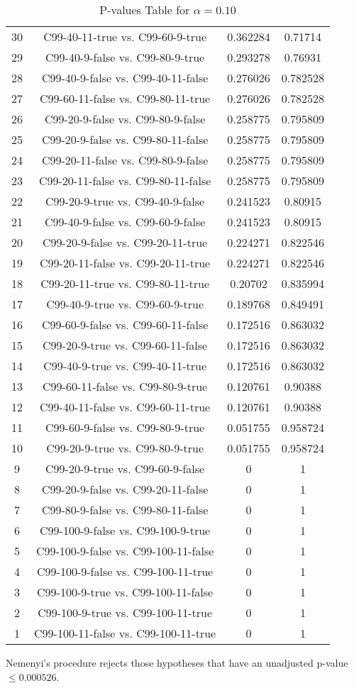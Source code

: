\documentclass[a4paper,10pt]{article}
\begin{document}
\begin{landscape}
\begin{table}[!htp]
\begin{tabular}{cccc}
30&C99-40-11-true vs. C99-60-9-true&0.362284&0.71714\\
29&C99-40-9-false vs. C99-80-9-true&0.293278&0.76931\\
28&C99-40-9-false vs. C99-40-11-false&0.276026&0.782528\\
27&C99-60-11-false vs. C99-80-11-true&0.276026&0.782528\\
26&C99-20-9-false vs. C99-80-9-false&0.258775&0.795809\\
25&C99-20-9-false vs. C99-80-11-false&0.258775&0.795809\\
24&C99-20-11-false vs. C99-80-9-false&0.258775&0.795809\\
23&C99-20-11-false vs. C99-80-11-false&0.258775&0.795809\\
22&C99-20-9-true vs. C99-40-9-false&0.241523&0.80915\\
21&C99-40-9-false vs. C99-60-9-false&0.241523&0.80915\\
20&C99-20-9-false vs. C99-20-11-true&0.224271&0.822546\\
19&C99-20-11-false vs. C99-20-11-true&0.224271&0.822546\\
18&C99-20-11-true vs. C99-80-11-true&0.20702&0.835994\\
17&C99-40-9-true vs. C99-60-9-true&0.189768&0.849491\\
16&C99-60-9-false vs. C99-60-11-false&0.172516&0.863032\\
15&C99-20-9-true vs. C99-60-11-false&0.172516&0.863032\\
14&C99-40-9-true vs. C99-40-11-true&0.172516&0.863032\\
13&C99-60-11-false vs. C99-80-9-true&0.120761&0.90388\\
12&C99-40-11-false vs. C99-60-11-true&0.120761&0.90388\\
11&C99-60-9-false vs. C99-80-9-true&0.051755&0.958724\\
10&C99-20-9-true vs. C99-80-9-true&0.051755&0.958724\\
9&C99-20-9-true vs. C99-60-9-false&0&1\\
8&C99-20-9-false vs. C99-20-11-false&0&1\\
7&C99-80-9-false vs. C99-80-11-false&0&1\\
6&C99-100-9-false vs. C99-100-9-true&0&1\\
5&C99-100-9-false vs. C99-100-11-false&0&1\\
4&C99-100-9-false vs. C99-100-11-true&0&1\\
3&C99-100-9-true vs. C99-100-11-false&0&1\\
2&C99-100-9-true vs. C99-100-11-true&0&1\\
1&C99-100-11-false vs. C99-100-11-true&0&1\\
\hline
\end{tabular}
\caption{P-values Table for $\alpha=0.10$}
\end{table}Nemenyi's procedure rejects those hypotheses that have an unadjusted p-value $\le0.000526$.


\end{landscape}
\end{document}
